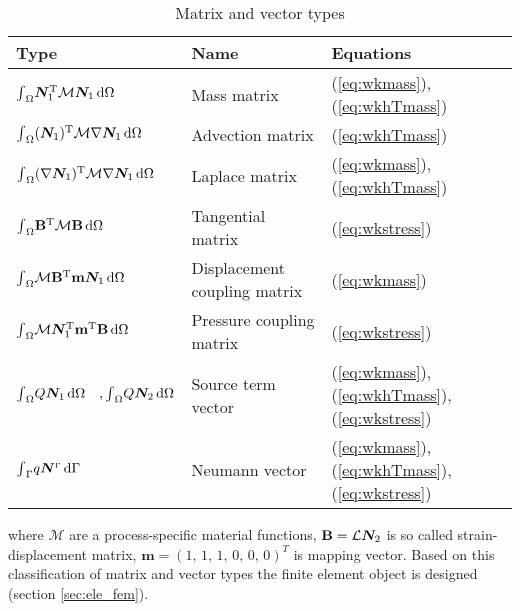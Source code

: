 \begin{table}[H]
\centering
\begin{tabular}{lll}
\hline
Type & Name & Equations
\\
\hline
$ {\int}_{\Omega} \bm N_1^{\mathrm{T}} \mathcal{M} \bm N_1 \,\mathrm{d} \Omega $ %
& Mass matrix
& (\ref{eq:wkmass}),(\ref{eq:wkhTmass})
\\
$ {\int}_{\Omega} (\bm N_1)^{\mathrm{T}} \mathcal{M} \nabla \bm N_1 \,\mathrm{d} \Omega $ %
& Advection matrix
& (\ref{eq:wkhTmass})
\\
$ {\int}_{\Omega} (\nabla \bm N_1)^{\mathrm{T}} \mathcal{M} \nabla \bm N_1 \,\mathrm{d} \Omega $ %
& Laplace matrix
& (\ref{eq:wkmass}),(\ref{eq:wkhTmass})
\\
$ {\int}_{\Omega} \mathbf B^{\mathrm{T}} \mathcal{M}  \mathbf B \,\mathrm{d} \Omega $ %
& Tangential matrix
& (\ref{eq:wkstress})
\\
$ {\int}_{\Omega} \mathcal{M} {\mathbf B}^{\mathrm{T}} \mathbf{m} \bm N_1 \,\mathrm{d} \Omega $ %
& Displacement coupling matrix
& (\ref{eq:wkmass})
\\
$ {\int}_{\Omega} \mathcal{M}\bm N_1^{\mathrm{T}} \mathbf{m}^{\mathrm{T}} \mathbf B\,\mathrm{d} \Omega $ %
& Pressure coupling matrix
& (\ref{eq:wkstress})
\\
$ {\int}_{\Omega} Q \bm N_1 \,\mathrm{d} \Omega \quad \mbox{,} \,{\int}_{\Omega} Q \bm N_2 \,\mathrm{d} \Omega $ %
& Source term vector
& (\ref{eq:wkmass}),(\ref{eq:wkhTmass}),(\ref{eq:wkstress})
\\
$ {\int}_{\Gamma} q \bm N^{\scriptscriptstyle \Gamma} \,\mathrm{d} \Gamma $ %
& Neumann vector
& (\ref{eq:wkmass}),(\ref{eq:wkhTmass}),(\ref{eq:wkstress})
\\
\hline
\end{tabular}
\caption{Matrix and vector types} \label{tab:types}
\end{table}

where $\mathcal{M}$ are a process-specific material functions,
$\mathbf B= \mathcal L \bm N_2$ is so called strain-displacement
matrix, $\mathbf m = (1,\,1,\,1,\,0,\,0,\,0)^T$ is mapping vector. Based on
this classification of matrix and vector types the finite element
object is designed (section \ref{sec:ele_fem}).
